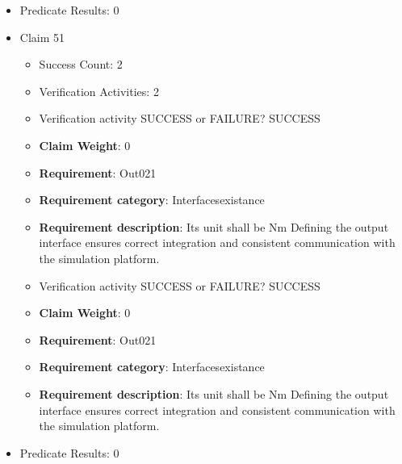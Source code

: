 \documentclass{article}
\begin{document}
\begin{itemize}
\begin{itemize}
					\item Verification activity SUCCESS or FAILURE? SUCCESS
					\item \textbf{Claim Weight}: 0
						\item \textbf{Requirement}: Out020 
						\item \textbf{Requirement category}: Interfacesexistance 
						\item \textbf{Requirement description}: Its unit shall be Nm Defining the output interface ensures correct integration and consistent communication with the simulation platform.
					
				\end{itemize}
				
									    
				\item Predicate Results: 0

  				  \item Claim 51
				\begin{itemize}
			    	\item Success Count: 2 
			    	\item Verification Activities: 2
					\item Verification activity SUCCESS or FAILURE? SUCCESS
					\item \textbf{Claim Weight}: 0
						\item \textbf{Requirement}: Out021 
						\item \textbf{Requirement category}: Interfacesexistance 
						\item \textbf{Requirement description}: Its unit shall be Nm Defining the output interface ensures correct integration and consistent communication with the simulation platform.
					
					\item Verification activity SUCCESS or FAILURE? SUCCESS
					\item \textbf{Claim Weight}: 0
						\item \textbf{Requirement}: Out021 
						\item \textbf{Requirement category}: Interfacesexistance 
						\item \textbf{Requirement description}: Its unit shall be Nm Defining the output interface ensures correct integration and consistent communication with the simulation platform.
					
				\end{itemize}
				
									    
				\item Predicate Results: 0


\end{itemize}
\end{document}
